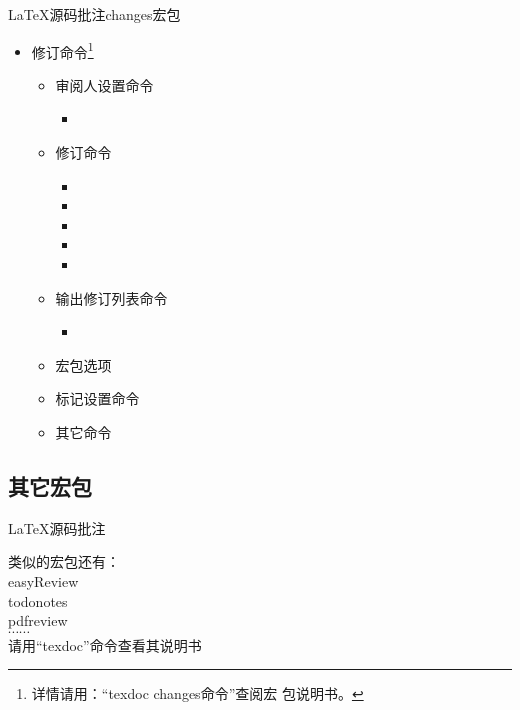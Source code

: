 \documentclass[fontset = none, t, aspectratio=169]{ctexbeamer}
\begin{document}
\begin{frame}{\LaTeX 源码批注}{changes宏包}
  \begin{itemize}
  \item 修订命令\footnote[frame,1]{详情请用：\enquote{\alert{texdoc changes}命令}查阅宏
      包说明书。}
    \begin{itemize}
    \item 审阅人设置命令
      \begin{itemize}
      \item {}
      \end{itemize}
    \item 修订命令
      \begin{itemize}
      \item {}
      \item {}
      \item {}  
      \item {}
      \item {}  
      \end{itemize}
    \item 输出修订列表命令
      \begin{itemize}
      \item \texinline{\listofchanges[style=<style>, title=<title>, show=<type>]}
      \end{itemize}
    \item 宏包选项
    \item 标记设置命令
    \item 其它命令
    \end{itemize}
  \end{itemize}
\end{frame}

\subsection[其它宏包]{其它宏包}
\begin{frame}[c]{\LaTeX 源码批注}
  \begin{center}
    \begin{spacing}{1.8}
       类似的宏包还有：\\
       easyReview\\
       todonotes\\
       pdfreview\\$\cdots\cdots$\\
       请用\enquote{\alert{texdoc}}命令查看其说明书
    \end{spacing}
  \end{center}
\end{frame}
\end{document}
